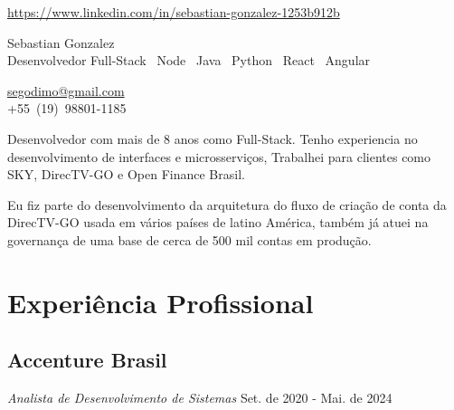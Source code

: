 \documentclass[a4paper,10pt]{article}
\makeatletter
\newcommand{\linkedin}{https://www.linkedin.com/in/sebastian-gonzalez-1253b912b}
\newcommand{\mobile}{+55~(19)~98801-1185}
\newcommand{\email}{segodimo@gmail.com}
\makeatother
\begin{document}
\noindent %


\hfill\textcolor{corSection}{\href{\linkedin}{\linkedin}} 
\begin{minipage}[t]{0.7\textwidth}
  \raggedright %
  \vspace{6mm} %
  \Huge{\textcolor{corHuge}{Sebastian Gonzalez}} \\
  \vspace{2mm} %
  \large{\textcolor{corLarge}{Desenvolvedor Full-Stack}} \textbar\ 
  \large{\textcolor{corLarge}{Node}} \textbar\
  \large{\textcolor{corLarge}{Java}} \textbar\
  \large{\textcolor{corLarge}{Python}} \textbar\
  \large{\textcolor{corLarge}{React}} \textbar\
  \large{\textcolor{corLarge}{Angular}}
\end{minipage}%
\begin{minipage}[t]{0.3\textwidth}
  \raggedleft %
  \setlength{\parskip}{0pt} %
  \textcolor{corSection}{\href{mailto:\email}{\email}} \\
  \textcolor{corSection}{\mobile} 

\end{minipage}

\vspace{5mm}

Desenvolvedor com mais de 8 anos como Full-Stack.
Tenho experiencia no desenvolvimento de interfaces e microsserviços,
Trabalhei para clientes como SKY, DirecTV-GO e Open Finance Brasil.

Eu fiz parte do desenvolvimento da arquitetura do fluxo de criação de conta da DirecTV-GO
usada em vários países de latino América,
também já atuei na governança de uma base de cerca de 500 mil contas em produção.

\section*{Experiência Profissional}
\noindent\makebox[\linewidth]{\rule{\linewidth}{0.1mm}\textcolor{corLarge}{}}

\subsection*{Accenture Brasil}
\textcolor{corSubSection}{\emph{Analista de Desenvolvimento de Sistemas}}
\hfill \textcolor{corSubSection}{Set. de 2020 - Mai. de 2024}
\end{document}
